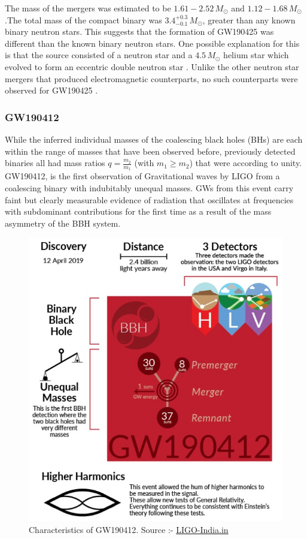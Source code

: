 The mass of the mergers was estimated to be $1.61-2.52\,M_\odot$ and $1.12 - 1.68\,M_\odot$.The total mass of the compact binary was $3.4_{-0.1}^{+0.3}\, M_\odot$, greater than any known binary neutron stars. This suggests that the formation of GW190425 was different than the known binary neutron stars. One possible explanation for this is that the source consisted of a neutron star and a $4.5\,M_\odot$ helium star which evolved to form an eccentric double neutron star \cite{Romero_Shaw_2020}. Unlike the other neutron star mergers that produced electromagnetic counterparts, no such counterparts were observed for GW190425 \cite{GW190425_1}.

\pagebreak

\subsubsection{GW190412}

While the inferred individual masses of the coalescing black holes (BHs) are each within the range of masses that have been observed before, previously detected binaries all had mass ratios $ q = \frac{m_2}{m_1}$ (with $m_1 \geq m_2$) that were according to unity. GW190412, is the first observation of Gravitational waves by LIGO from a coalescing binary with indubitably unequal masses. GWs from this event carry faint but clearly measurable evidence of radiation that oscillates at frequencies with subdominant contributions for the first time as a result of the mass asymmetry of the BBH system.

\begin{figure}[h]
    \centering
    \includegraphics[scale=1.15]{images.tex/GW190412.jpg}
    \caption{Characteristics of GW190412. Source :- \href{https://www.ligo-india.in/outreach/detections/gw190412/}{LIGO-India.in}}
\end{figure}

